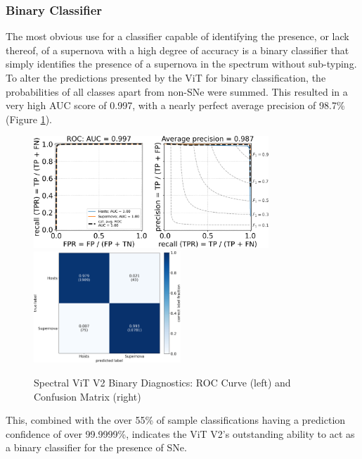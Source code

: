 \subsubsection{Binary Classifier}

The most obvious use for a classifier capable of identifying the presence, or lack thereof, of a supernova 
with a high degree of accuracy is a binary classifier that simply identifies the presence of a supernova in the spectrum without sub-typing. To alter the predictions presented by the ViT 
for binary classification, the probabilities of all classes apart from 
non-SNe were summed. This resulted in a very high AUC score of 0.997, with a 
nearly perfect average precision of 98.7\% (Figure \ref{fig:v2_binary_qual}).
\begin{figure}[t!]
    \centering
    \includegraphics[height=4.2cm]{figures/v2_real/vit_model_V2rocfull_binary_e26.png}
    \quad
    \includegraphics[height=4.2cm]{figures/v2_real/vit_model_V2cmfull_binary_e26.png}
    \caption[Spectral ViT V2 Binary Diagnostics]{Spectral ViT V2 Binary Diagnostics:
    ROC Curve (left) and Confusion Matrix (right)\label{fig:v2_binary_qual}}
\end{figure}
This, combined with the over 55\% of sample classifications having a prediction confidence of over 99.9999\%,
indicates the ViT V2's outstanding ability to act as a binary classifier for the presence of SNe.

